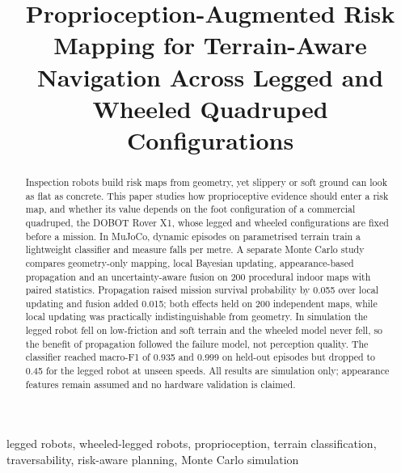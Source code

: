 \documentclass[conference,a4paper]{IEEEtran}
\begin{document}
\title{Proprioception-Augmented Risk Mapping for Terrain-Aware Navigation Across Legged and Wheeled Quadruped Configurations}

\author{
}

\maketitle

\begin{abstract}
Inspection robots build risk maps from geometry, yet slippery or soft ground can look as flat as concrete. This paper studies how proprioceptive evidence should enter a risk map, and whether its value depends on the foot configuration of a commercial quadruped, the DOBOT Rover X1, whose legged and wheeled configurations are fixed before a mission. In MuJoCo, \vnEpisodesTotal{} dynamic episodes on parametrised terrain train a lightweight classifier and measure falls per metre. A separate Monte Carlo study compares geometry-only mapping, local Bayesian updating, appearance-based propagation and an uncertainty-aware fusion on 200 procedural indoor maps with paired statistics. Propagation raised mission survival probability by 0.055 over local updating and fusion added 0.015; both effects held on 200 independent maps, while local updating was practically indistinguishable from geometry. In simulation the legged robot fell on low-friction and soft terrain and the wheeled model never fell, so the benefit of propagation followed the failure model, not perception quality. The classifier reached macro-F1 of 0.935 and 0.999 on held-out episodes but dropped to 0.45 for the legged robot at unseen speeds. All results are simulation only; appearance features remain assumed and no hardware validation is claimed.
\end{abstract}

\begin{IEEEkeywords}
legged robots, wheeled-legged robots, proprioception, terrain classification, traversability, risk-aware planning, Monte Carlo simulation
\end{IEEEkeywords}
\end{document}
